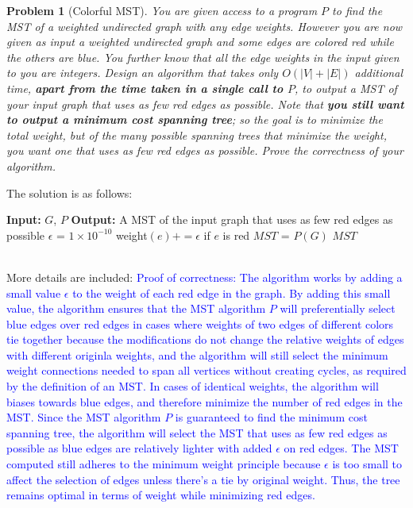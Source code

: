 \documentclass[10pt]{article}
\newtheorem{problem}{\sc\color{cit}Problem}
\begin{document}
\begin{problem}[Colorful MST]
    You are given access to a program $P$ to find the MST of a weighted undirected graph with any edge weights. However you are now given as input a weighted undirected graph and some edges are colored red while the others are blue. You further know that all the edge weights in the input given to you are integers. Design an algorithm that takes only $O(|V|+|E|)$ additional time, \textbf{apart from the time taken in a single call to $P$}, to output a MST of your input graph that uses as few red edges as possible. Note that \textbf{you still want to output a minimum cost spanning tree}; so the goal is to minimize the total weight, but of the many possible spanning trees that minimize the weight, you want one that uses as few red edges as possible. Prove the correctness of your algorithm.
\end{problem}
\begin{solution}
    The solution is as follows:
    \begin{algorithm}
        \caption{Colorful MST} 
        \begin{algorithmic}[1]
        \Statex \textbf{Input:} $G$, $P$
        \Statex \textbf{Output:} A MST of the input graph that uses as few red edges as possible
        \Statex 
            \State $\epsilon$ = $1 \times 10^{-10}$
                \State weight$(e) += \epsilon$ if $e$ is red
            \EndFor
            \State $MST$ = $P(G)$ 
            \Return $MST$
        \EndFunction
        \end{algorithmic}
    \end{algorithm} \\
    More details are included: \textcolor{blue}{Proof of correctness: The algorithm works by adding a small value $\epsilon$ to the weight of each red edge in the graph. By adding this small value, the algorithm ensures that the MST algorithm $P$ will preferentially select blue edges over red edges in cases where weights of two edges of different colors tie together because the modifications do not change the relative weights of edges with different originla weights, and the algorithm will still select the minimum weight connections needed to span all vertices without creating cycles, as required by the definition of an MST. In cases of identical weights, the algorithm will biases towards blue edges, and therefore minimize the number of red edges in the MST. 
     Since the MST algorithm $P$ is guaranteed to find the minimum cost spanning tree, the algorithm will select the MST that uses as few red edges as possible as blue edges are relatively lighter with added $\epsilon$ on red edges.
     The MST computed still adheres to the minimum weight principle because $\epsilon$ is too small to affect the selection of edges unless there's a tie by original weight. Thus, the tree remains optimal in terms of weight while minimizing red edges.}
\end{solution}
\end{document}
